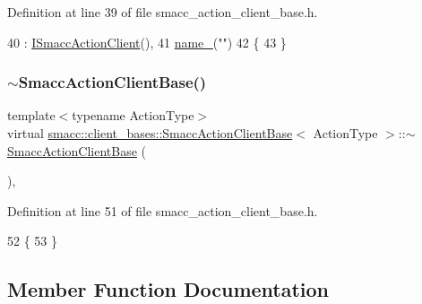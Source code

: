 Definition at line 39 of file smacc\+\_\+action\+\_\+client\+\_\+base.\+h.


\begin{DoxyCode}
40         : \hyperlink{classsmacc_1_1client__bases_1_1ISmaccActionClient_a379f2672d1b971422821026ca90eb96a}{ISmaccActionClient}(),
41           \hyperlink{classsmacc_1_1client__bases_1_1SmaccActionClientBase_a7f2e1834e915bdf7ae9db8b90b4597e6}{name\_}(\textcolor{stringliteral}{""})
42     \{
43     \}
\end{DoxyCode}
\mbox{\label{classsmacc_1_1client__bases_1_1SmaccActionClientBase_aa6daf2d88aa6254e5a5c10b2c2152fad}} 
\subsubsection{\texorpdfstring{$\sim$\+Smacc\+Action\+Client\+Base()}{~SmaccActionClientBase()}}
{\footnotesize\ttfamily template$<$typename Action\+Type$>$ \\
virtual \hyperlink{classsmacc_1_1client__bases_1_1SmaccActionClientBase}{smacc\+::client\+\_\+bases\+::\+Smacc\+Action\+Client\+Base}$<$ Action\+Type $>$\+::$\sim$\hyperlink{classsmacc_1_1client__bases_1_1SmaccActionClientBase}{Smacc\+Action\+Client\+Base} (\begin{DoxyParamCaption}{ }\end{DoxyParamCaption})\hspace{0.3cm}{\ttfamily [inline]}, {\ttfamily [virtual]}}



Definition at line 51 of file smacc\+\_\+action\+\_\+client\+\_\+base.\+h.


\begin{DoxyCode}
52     \{
53     \}
\end{DoxyCode}


\subsection{Member Function Documentation}
\mbox{\label{classsmacc_1_1client__bases_1_1SmaccActionClientBase_a2936b800b46ac557550cbeda563209b3}} 
